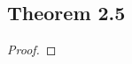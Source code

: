 \documentclass[../../main.tex]{subfiles}
\begin{document}
\subsection{Theorem 2.5}
\begin{wts}

\end{wts}
\begin{proof}

\end{proof}
\end{document}

